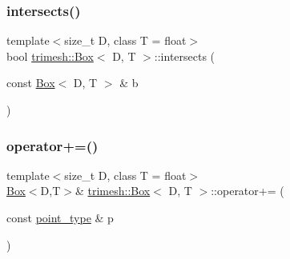 \mbox{\label{classtrimesh_1_1Box_a517e3bf133bf9d42e9ef70f078596764}} 
\subsubsection{\texorpdfstring{intersects()}{intersects()}}
{\footnotesize\ttfamily template$<$size\+\_\+t D, class T = float$>$ \\
bool \hyperlink{classtrimesh_1_1Box}{trimesh\+::\+Box}$<$ D, T $>$\+::intersects (\begin{DoxyParamCaption}\item[{const \hyperlink{classtrimesh_1_1Box}{Box}$<$ D, T $>$ \&}]{b }\end{DoxyParamCaption})\hspace{0.3cm}{\ttfamily [inline]}}

\mbox{\label{classtrimesh_1_1Box_a7cfdd9e833ffd23d6dacd0dd0de83728}} 
\subsubsection{\texorpdfstring{operator+=()}{operator+=()}\hspace{0.1cm}{\footnotesize\ttfamily [1/2]}}
{\footnotesize\ttfamily template$<$size\+\_\+t D, class T = float$>$ \\
\hyperlink{classtrimesh_1_1Box}{Box}$<$D,T$>$\& \hyperlink{classtrimesh_1_1Box}{trimesh\+::\+Box}$<$ D, T $>$\+::operator+= (\begin{DoxyParamCaption}\item[{const \hyperlink{classtrimesh_1_1Box_a208c806781f96a7001491a275dfa7655}{point\+\_\+type} \&}]{p }\end{DoxyParamCaption})\hspace{0.3cm}{\ttfamily [inline]}}

\mbox{\label{classtrimesh_1_1Box_ab62681c3d2495c4acd1b77be635813a6}} 
